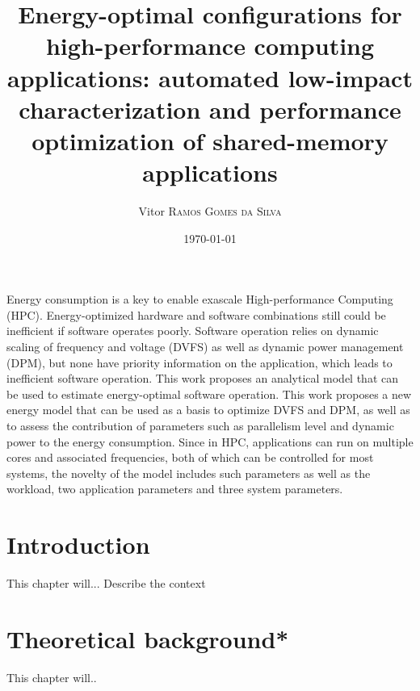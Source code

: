 \documentclass[
papersize=a4,
pagelayout=default,
fontname=latinmodern,
fontsize=11pt,
twoside,
final,
faculty=fpms,
]{umons-Thesis}
\author{Vitor \textsc{Ramos Gomes da Silva}}
\date{\today}
\title{Energy-optimal configurations for high-performance computing applications: automated low-impact characterization and performance optimization of shared-memory applications}
\begin{document}
	
	\umonsThesisTitlePage
	
	
	\frontmatter
	
	\begin{umonsThesisAbstract}
		Energy consumption is a key to enable exascale High-performance Computing (HPC). Energy-optimized hardware and software combinations still could be inefficient if software operates poorly. 
		Software operation relies on dynamic scaling of frequency and voltage (DVFS) as well as dynamic power management (DPM), but none have priority information on the application, which leads to inefficient software operation. This work proposes an analytical model that can be used to estimate energy-optimal software operation. 
		This work proposes a new energy model that can be used as a basis to optimize DVFS and DPM, as well as to assess the contribution of parameters such as parallelism level and dynamic power to the energy consumption.
		Since in HPC, applications can run on multiple cores and associated frequencies, both of which can be controlled for most systems, the novelty of the model includes such parameters as well as the workload, two application parameters and three system parameters.
	\end{umonsThesisAbstract}
	
	
	\tableofcontents*
	\listoffigures*
	\listoftables*
	
	
	\mainmatter
	
	\chapter{Introduction}
	This chapter will...
	Describe the context
	
	
	
	\chapter{Theoretical background*}
	This chapter will..
	
	
\end{document}
